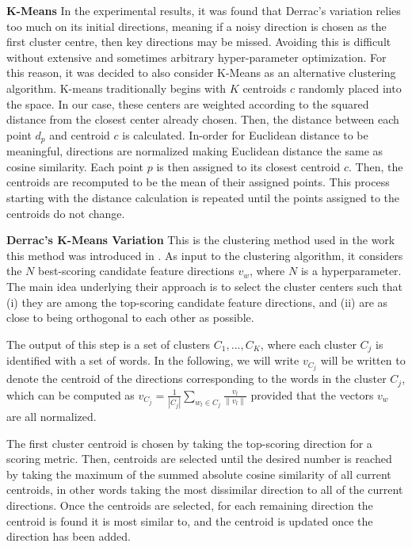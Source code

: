 \noindent \textbf{K-Means} In the experimental results, it was found that Derrac's variation relies too much on its initial directions, meaning if a noisy direction is chosen as the first cluster centre, then key directions may be missed. Avoiding this is difficult without extensive and sometimes arbitrary hyper-parameter optimization. For this reason, it was decided to also consider K-Means as an alternative clustering algorithm. K-means traditionally begins with $K$ centroids $c$ randomly placed into the space. In our case, these centers are weighted according to the squared distance from the closest center already chosen. \cite{Arthur} %
Then, the distance between each point $d_p$ and centroid $c$ is calculated. In-order for Euclidean distance to be meaningful, directions are normalized making Euclidean   distance the same as cosine similarity. Each point $p$ is then assigned to its closest centroid $c$. Then, the centroids are recomputed to be the mean of their assigned points. This process starting with the distance calculation is repeated until the points assigned to the centroids do not change. 

\noindent \textbf{Derrac's K-Means Variation} This is the clustering method used in the work this method was introduced in \cite{derrac2015}. As input to the clustering algorithm, it considers the $N$ best-scoring candidate feature directions $v_w$, where $N$ is a hyperparameter. The main idea underlying their approach is to select the cluster centers such that (i) they are among the top-scoring candidate feature directions, and (ii) are as close to being orthogonal to each other as possible. 
 
The output of this step is a set of clusters $C_1,...,C_K$, where each cluster $C_j$ is identified with a set of words.
In the following, we will write   $v_{C_j}$ will be written to denote the centroid of the directions corresponding to the words in the cluster $C_j$, which can be computed as $v_{C_j}= \frac{1}{|C_j|} \sum_{w_l\in C_j} \frac{v_l}{\| v_l \|} $ provided that the vectors $v_w$ are all normalized. 

The first cluster centroid is chosen by taking the top-scoring direction for a scoring metric. Then, centroids are selected until the desired number is reached by taking the maximum of the summed absolute cosine similarity of all current centroids, in other words taking the most dissimilar direction to all of the current directions. Once the centroids are selected, for each remaining direction the centroid is found it is most similar to, and the centroid is updated once the direction has been added. 


